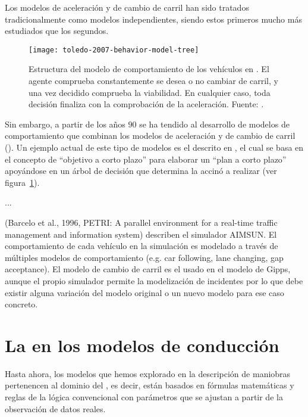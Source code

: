Los modelos de aceleración y de cambio de carril han sido tratados tradicionalmente como modelos independientes, siendo estos primeros mucho más estudiados que los segundos.

\begin{figure}
	\texttt{[image: toledo-2007-behavior-model-tree]}
	\caption{Estructura del modelo de comportamiento de los vehículos en \cite{Toledo2007}. El agente comprueba constantemente se desea o no cambiar de carril, y una vez decidido comprueba la viabilidad. En cualquier caso, toda decisión finaliza con la comprobación de la aceleración. Fuente: \cite{Toledo2007}.}
	\label{fig:toledo-2007-behavior-model-tree}
\end{figure}

Sin embargo, a partir de los años $90$ se ha tendido al desarrollo de modelos de comportamiento que combinan los modelos de aceleración y de cambio de carril (\cite{Ma2004}). Un ejemplo actual de este tipo de modelos es el descrito en \cite{Toledo2007}, el cual se basa en el concepto de \enquote{objetivo a corto plazo} para elaborar un \enquote{plan a corto plazo} apoyándose en un árbol de decisión que determina la accinó a realizar (ver figura~\ref{fig:toledo-2007-behavior-model-tree}).

...

(Barcelo et al., 1996, PETRI: A parallel environment for a real-time traffic management and information system) describen el simulador AIMSUN. El comportamiento de cada vehículo en la simulación es modelado a través de múltiples modelos de comportamiento (e.g. car following, lane changing, gap acceptance). El modelo de cambio de carril es el usado en el modelo de Gipps, aunque el propio simulador permite la modelización de incidentes por lo que debe existir alguna variación del modelo original o un nuevo modelo para ese caso concreto.

\section{La  en los modelos de conducción}

Hasta ahora, los modelos que hemos explorado en la descripción de maniobras pertenencen al dominio del  , es decir, están basados en fórmulas matemáticas y reglas de la lógica convencional con parámetros que se ajustan a partir de la observación de datos reales.

